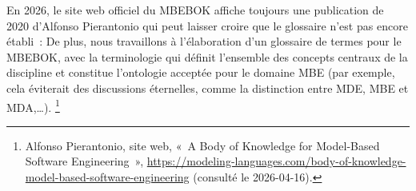 {En 2026, le site web officiel du MBEBOK affiche toujours une publication de 2020 d'Alfonso Pierantonio qui peut laisser croire que le glossaire n'est pas encore établi~: 
 {De plus, nous travaillons à l'élaboration d'un glossaire de termes pour le MBEBOK, avec la terminologie qui définit l'ensemble des concepts centraux de la discipline et constitue l'ontologie acceptée pour le domaine MBE (par exemple, cela éviterait des discussions éternelles, comme la distinction entre MDE, MBE et MDA,…).} {\footnote{Alfonso Pierantonio, site web, «~A Body of Knowledge for Model-Based Software Engineering~», \url{https://modeling-languages.com/body-of-knowledge-model-based-software-engineering} (consulté le 2026-04-16).}}

}{}

